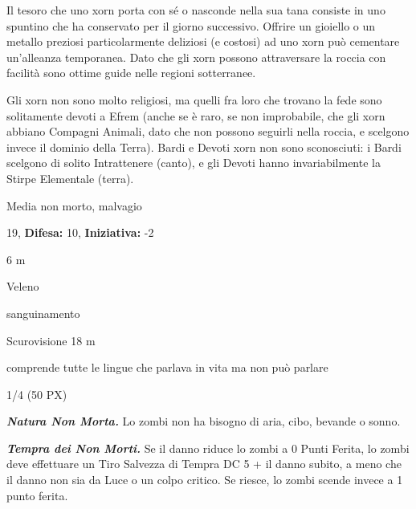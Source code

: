 \begin{multicols}{2}
{Il tesoro che uno xorn porta con sé o nasconde nella sua tana consiste in uno spuntino che ha conservato per il giorno successivo. Offrire un gioiello o un metallo preziosi particolarmente deliziosi (e costosi) ad uno xorn può cementare un'alleanza temporanea. Dato che gli xorn possono attraversare la roccia con facilità sono ottime guide nelle regioni sotterranee.

Gli xorn non sono molto religiosi, ma quelli fra loro che trovano la fede sono solitamente devoti a Efrem (anche se è raro, se non improbabile, che gli xorn abbiano Compagni Animali, dato che non possono seguirli nella roccia, e scelgono invece il dominio della Terra). Bardi e Devoti xorn non sono sconosciuti: i Bardi scelgono di solito Intrattenere (canto), e gli Devoti hanno invariabilmente la Stirpe Elementale (terra).


\noindent
\begin{description}[noitemsep, topsep=0pt, parsep=0pt, partopsep=0pt, leftmargin=0cm, labelwidth=2.2cm]
	\item[\textbf{Taglia/Tipo:}] Media non morto, malvagio
	\item[\textbf{Caratt.:}] 
	\item[\textbf{Punti Ferita:}] 19,  \textbf{Difesa:} 10,  \textbf{Iniziativa:} -2
	\item[\textbf{Movimento:}] 6 m
	\item[\textbf{Tiri Salvez.:}] 
	\item[\textbf{Imm. Danni:}] Veleno
	\item[\textbf{Immunità:}] sanguinamento
	\item[\textbf{Sensi:}] Scurovisione 18 m
	\item[\textbf{Linguaggi:}] comprende tutte le lingue che parlava in vita ma non può parlare
	\item[\textbf{Sfida:}] 1/4 (50 PX)\smallskip
\end{description}

\emph{\textbf{Natura Non Morta.}} Lo zombi non ha bisogno di aria, cibo, bevande o sonno.

\emph{\textbf{Tempra dei Non Morti.}} Se il danno riduce lo zombi a 0 Punti Ferita, lo zombi deve effettuare un Tiro Salvezza di Tempra DC 5 + il danno subito, a meno che il danno non sia da Luce o un colpo critico. Se riesce, lo zombi scende invece a 1 punto ferita.

}
\end{multicols}
